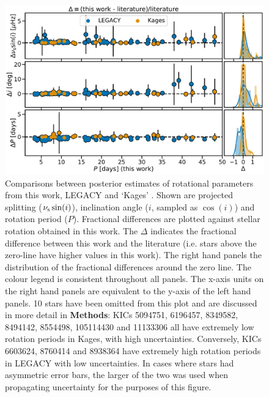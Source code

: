 \begin{figure}[h!]
	\centering
	\includegraphics[width=\textwidth]{Images/litcomp_alt2.pdf}
	\caption{Comparisons between posterior estimates of rotational parameters from this work, LEGACY and `Kages' \cite[private communication]{m_davies+2016, m_lund+2017}.  Shown are projected splitting ($\nu_{\rm s}\sin(i)$), inclination angle ($i$, sampled as $\cos(i)$) and rotation period ($P$). Fractional differences are plotted against stellar rotation obtained in this work. The $\Delta$ indicates the fractional difference between this work and the literature (i.e. stars above the zero-line have higher values in this work). The right hand panels the distribution of the fractional differences around the zero line. The colour legend is consistent throughout all panels. The x-axis units on the right hand panels are equivalent to the y-axis of the left hand panels. 10 stars have been omitted from this plot and are discussed in more detail in \textbf{Methods}: KICs 5094751, 6196457, 8349582, 8494142, 8554498, 105114430 and 11133306 all have extremely low rotation periods in Kages, with high uncertainties. Conversely, KICs 6603624, 8760414 and 8938364 have extremely high rotation periods in LEGACY with low uncertainties. In cases where stars had asymmetric error bars, the larger of the two was used when propagating uncertainty for the purposes of this figure.}
	\label{fig:legacykages}
\end{figure}
 
